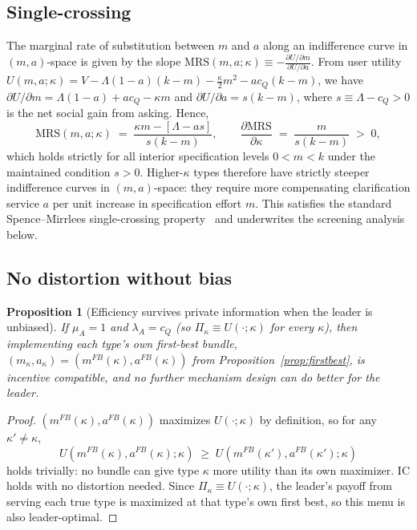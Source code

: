 \documentclass[11pt]{article}
\newtheorem{proposition}{Proposition}
\begin{document}
\subsection{Single-crossing}
The marginal rate of substitution between $m$ and $a$ along an indifference curve in $(m,a)$-space is given by the slope $\text{MRS}(m,a;\kappa) \equiv -\frac{\partial U/\partial m}{\partial U/\partial a}$.
From user utility $U(m,a;\kappa) = V - \Lambda(1-a)(k-m) - \frac{\kappa}{2}m^2 - ac_Q(k-m)$,
we have $\partial U/\partial m = \Lambda(1-a) + ac_Q - \kappa m$ and $\partial U/\partial a = s(k-m)$,
where $s \equiv \Lambda - c_Q > 0$ is the net social gain from asking. Hence,
\[
\text{MRS}(m,a;\kappa) \;=\; \frac{\kappa m - [\Lambda - as]}{s(k-m)}, \qquad \frac{\partial \text{MRS}}{\partial \kappa} \;=\; \frac{m}{s(k-m)} \;>\; 0,
\]
which holds strictly for all interior specification levels $0 < m < k$ under the maintained condition $s > 0$.
Higher-$\kappa$ types therefore have strictly steeper indifference curves in $(m,a)$-space: they require more compensating clarification service $a$ per unit increase in specification effort $m$. This satisfies the standard Spence--Mirrlees single-crossing property~\citep{spence1973} and underwrites the screening analysis below.

\subsection{No distortion without bias}

\begin{proposition}[Efficiency survives private information when the leader is unbiased]
\label{prop:nodistortion}
If $\mu_A=1$ and $\lambda_A=c_Q$ (so $\Pi_\kappa \equiv U(\cdot;\kappa)$ for every
$\kappa$), then implementing each type's own first-best bundle,
$(m_\kappa,a_\kappa)=(m^{FB}(\kappa),a^{FB}(\kappa))$ from
Proposition~\ref{prop:firstbest}, is incentive compatible, and no further
mechanism design can do better for the leader.
\end{proposition}

\begin{proof}
$(m^{FB}(\kappa),a^{FB}(\kappa))$ maximizes $U(\cdot;\kappa)$ by definition, so for
any $\kappa'\ne\kappa$,
\[
U(m^{FB}(\kappa),a^{FB}(\kappa);\kappa) \;\ge\; U(m^{FB}(\kappa'),a^{FB}(\kappa');\kappa)
\]
holds trivially: no bundle can give type $\kappa$ more utility than its own maximizer.
IC holds with no distortion needed. Since $\Pi_\kappa\equiv U(\cdot;\kappa)$, the leader's payoff
from serving each true type is maximized at that type's own first best, so
this menu is also leader-optimal.
\end{proof}
\end{document}

